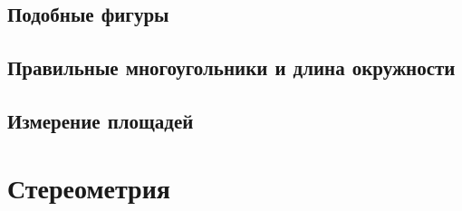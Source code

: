 \documentclass[twoside]{book}
\begin{document}
\chapter{Подобные фигуры}








\chapter[Правильные многоугольники]{Правильные многоугольники и длина окружности}



\chapter{Измерение площадей}




\part{Стереометрия}



{\scriptsize
\printindex
}



\tableofcontents


\end{document}

